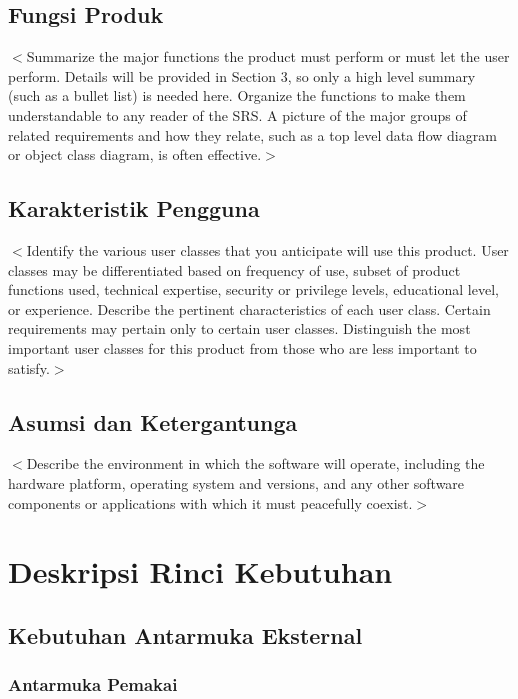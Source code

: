 \documentclass{scrreprt}
\begin{document}
\section{Fungsi Produk}
$<$Summarize the major functions the product must perform or must let the user 
perform. Details will be provided in Section 3, so only a high level summary 
(such as a bullet list) is needed here. Organize the functions to make them 
understandable to any reader of the SRS. A picture of the major groups of 
related requirements and how they relate, such as a top level data flow diagram 
or object class diagram, is often effective.$>$

\section{Karakteristik Pengguna}
$<$Identify the various user classes that you anticipate will use this product.  
User classes may be differentiated based on frequency of use, subset of product 
functions used, technical expertise, security or privilege levels, educational 
level, or experience. Describe the pertinent characteristics of each user class.  
Certain requirements may pertain only to certain user classes. Distinguish the 
most important user classes for this product from those who are less important 
to satisfy.$>$

\section{Asumsi dan Ketergantunga}
$<$Describe the environment in which the software will operate, including the 
hardware platform, operating system and versions, and any other software 
components or applications with which it must peacefully coexist.$>$



\chapter{Deskripsi Rinci Kebutuhan}

\section{Kebutuhan Antarmuka Eksternal}

	\subsection{Antarmuka Pemakai}
	
\end{document}
